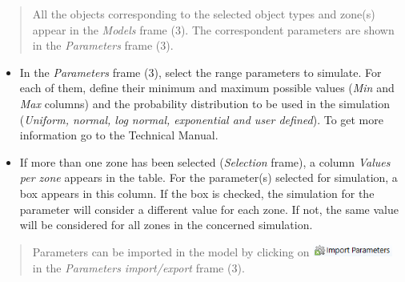 \documentclass[
  letterpaper,
  DIV=11,
  numbers=noendperiod]{scrreprt}
\begin{document}
\begin{quote}
All the objects corresponding to the selected object types and zone(s)
appear in the \emph{Models} frame (3). The correspondent parameters are
shown in the \emph{Parameters} frame (3).
\end{quote}

\begin{itemize}
\item
  {In the \emph{Parameters} frame (3), select the range parameters to
  simulate. For each of them, define their minimum and maximum possible
  values (\emph{Min} and \emph{Max} columns) and the probability
  distribution to be used in the simulation (\emph{Uniform, normal, log
  normal, exponential and user defined}). To get more information go to
  the Technical Manual.}
\item
  {If more than one zone has been selected (\emph{Selection} frame), a
  column \emph{Values per zone} appears in the table. For the
  parameter(s) selected for simulation, a box appears in this column. If
  the box is checked, the simulation for the parameter will consider a
  different value for each zone. If not, the same value will be
  considered for all zones in the concerned simulation.}
\end{itemize}

\begin{quote}
{Parameters can be imported in the model by clicking on
\includegraphics[width=\textwidth,height=0.16in]{./figures/fig-icon_calibrator_import_param.png}
in the \emph{Parameters import/export} frame (3).}
\end{quote}
\end{document}

